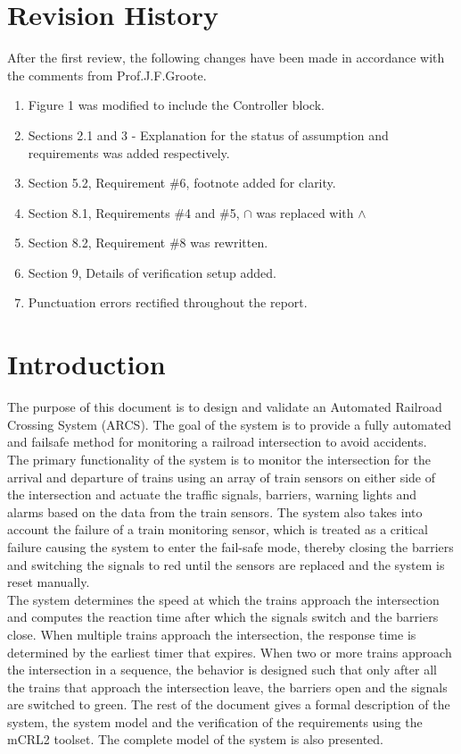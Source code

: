 \documentclass[10pt,a4paper]{article}
\begin{document}
\section{Revision History}
After the first review, the following changes have been made in accordance with the comments from Prof.J.F.Groote.
\begin{enumerate}
\item Figure 1 was modified to include the Controller block.
\item Sections 2.1 and 3 - Explanation for the status of assumption and requirements was added respectively.
\item Section 5.2, Requirement \#6, footnote added for clarity.
\item Section 8.1, Requirements \#4 and \#5, $\cap$ was replaced with $\wedge$
\item Section 8.2, Requirement \#8 was rewritten.
\item Section 9, Details of verification setup added.
\item Punctuation errors rectified throughout the report.

\end{enumerate}
\newpage
\section{Introduction}

The purpose of this document is to design and validate an Automated Railroad Crossing System (ARCS). The goal of the system is to provide a fully automated and failsafe method for monitoring a railroad intersection to avoid accidents. \\
The primary functionality of the system is to monitor the intersection for the arrival and departure of trains using an array of train sensors on either side of the intersection and actuate the traffic signals, barriers, warning lights and alarms based on the data from the train sensors. The system also takes into account the failure of a train monitoring sensor, which is treated as a critical failure causing the system to enter the fail-safe mode, thereby closing the barriers and switching the signals to red until the sensors are replaced and the system is reset manually.\\
The system determines the speed at which the trains approach the intersection and computes the reaction time after which the signals switch and the barriers close. When  multiple trains approach the intersection, the response time is determined by the earliest timer that expires. When two or more trains approach the intersection in a sequence, the behavior is designed such that only after all the trains that approach the intersection leave, the barriers open and the signals are switched to green. The rest of the document gives a formal description of the system, the system model and the verification of the requirements using the mCRL2 toolset. The complete model of the system is also presented.
\end{document}
